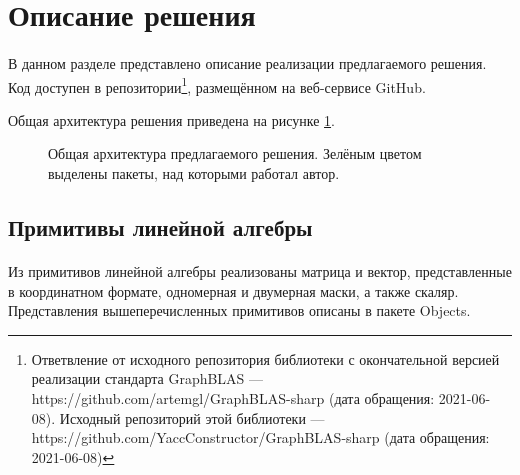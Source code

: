 \documentclass[14pt]{matmex-diploma-custom}
\begin{document}
\section{Описание решения}
\paragraph{} В данном разделе представлено описание реализации предлагаемого решения. Код доступен в репозитории\footnote{Ответвление от исходного репозитория библиотеки с окончательной версией реализации стандарта GraphBLAS --- https://github.com/artemgl/GraphBLAS-sharp (дата обращения: 2021-06-08). Исходный репозиторий этой библиотеки --- https://github.com/YaccConstructor/GraphBLAS-sharp (дата обращения: 2021-06-08)}, размещённом на веб-сервисе GitHub.

Общая архитектура решения приведена на рисунке \ref{architecture}.

\begin{figure}[h]
\caption{Общая архитектура предлагаемого решения. Зелёным цветом выделены пакеты, над которыми работал автор.}
\label{architecture}
\end{figure}

\subsection{Примитивы линейной алгебры}
\paragraph{} Из примитивов линейной алгебры реализованы матрица и вектор, представленные в координатном формате, одномерная и двумерная маски, а также скаляр. Представления вышеперечисленных примитивов описаны в пакете Objects.
\end{document}
